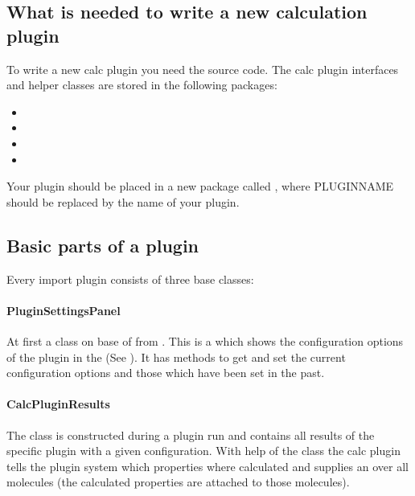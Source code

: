 \subsection{What is needed to write a new calculation plugin}
To write a new calc plugin you need the \sh source code.
The calc plugin interfaces and helper classes are stored in the following packages:

\begin{itemize}
  \item {}
  \item {}
  \item {}
  \item {}
\end{itemize}

Your plugin should be placed in a new package called
,
where PLUGINNAME should be replaced by the name of your plugin.

\subsection{Basic parts of a plugin}
Every import plugin consists of three base classes:

  \paragraph{PluginSettingsPanel}
  At first a class on base of 
  from .
  This is a  which shows the configuration options of the plugin
  in the  (See ).
  It has methods to get and set the current configuration options
  and those which have been set in the past.

  \paragraph{CalcPluginResults}
  The  class is constructed during a plugin run
  and contains all results of the specific plugin with a given configuration.
  With help of the  class the calc plugin
  tells the plugin system which properties where calculated and
  supplies an  over all molecules
  (the calculated properties are attached to those molecules).

